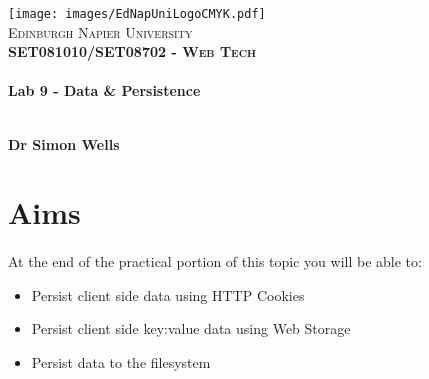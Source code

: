 \documentclass[10pt, a4paper]{article}
\begin{document}

\begin{titlepage}
\vspace*{5cm}
\begin{center}
\texttt{[image: images/EdNapUniLogoCMYK.pdf]}~\\[1cm]

\textsc{\Large Edinburgh Napier University}\\[1.5cm]

\textsc{\LARGE \bfseries SET081010/SET08702 - Web Tech}\\[0.5cm]

\hrulefill \\[0.4cm]
{\huge \bfseries Lab 9 - Data \& Persistence \\[0.4cm] }
\hrulefill \\[1.5cm]

\begin{minipage}{0.4\textwidth}
\begin{flushleft} \large
\textbf{Dr Simon Wells} \\
\end{flushleft}
\end{minipage}

\vfill

\end{center}
\end{titlepage}




%

\section*{Aims}
\paragraph{} At the end of the practical portion of this topic you will be able to:

\begin{itemize}
\item Persist client side data using HTTP Cookies
\item Persist client side key:value data using Web Storage
\item Persist data to the filesystem
\end{itemize}
\end{document}
